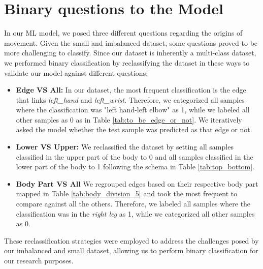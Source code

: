 \section{Binary questions to the Model}

In our ML model, we posed three different questions regarding the origins of movement. 
Given the small and imbalanced dataset, some questions proved to be more challenging to classify. 
Since our dataset is inherently a multi-class dataset, we performed binary classification by reclassifying the dataset in these ways to validate our model against different questions:

\begin{itemize}

    \item \textbf{Edge VS All:} In our dataset, the most frequent classification is the edge that links \textit{left\_hand} and \textit{left\_wrist}. 
    Therefore, we categorized all samples where the classification was "left hand-left elbow" as 1, while we labeled all other samples as 0 as in Table \ref{tab:to_be_edge_or_not}. 
    We iteratively asked the model whether the test sample was predicted as that edge or not.  
    
    \item \textbf{Lower VS Upper:} We reclassified the dataset by setting all samples classified in the upper part of the body to 0 and all samples classified in the lower part of the body to 1 following the schema in Table \ref{tab:top_bottom}.
    
    \item \textbf{Body Part VS All} We regrouped edges based on their respective body part mapped in Table \ref{tab:body_division_5} and took the most frequent to compare against all the others.
    Therefore, we labeled all samples where the classification was in the \textit{right leg} as 1, while we categorized all other samples as 0.

\end{itemize}
These reclassification strategies were employed to address the challenges posed by our imbalanced and small dataset, allowing us to perform binary classification for our research purposes.

